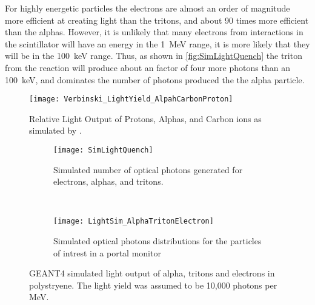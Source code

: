 For highly energetic particles the electrons are almost an order of magnitude more efficient at creating light than the tritons, and about 90 times more efficient than the alphas.
However, it is unlikely that many electrons from  interactions in the scintillator will have an energy in the \SI{1}{\MeV} range, it is more likely that they will be in the \SI{100}{\keV} range.
Thus, as shown in \autoref{fig:SimLightQuench} the triton from the  reaction will produce about an factor of four more photons than an \SI{100}{\keV}, and dominates the number of photons produced the the alpha particle.
\begin{figure}
  \centering
  \texttt{[image: Verbinski\_LightYield\_AlpahCarbonProton]}
  \caption[Relative Light Yield of Protons, Alphas, and Carbon ions in Anthracene]{Relative Light Output of Protons, Alphas, and Carbon ions as simulated by \cite{Verbinski_1968}.}
  \label{fig:VerbinskiLightOutput}
\end{figure}
\begin{figure}
  \centering
    \begin{subfigure}[b]{0.45\textwidth}
    \texttt{[image: SimLightQuench]}
    \caption{Simulated number of optical photons generated for electrons, alphas, and tritons.}
  \end{subfigure}%
  ~
  \begin{subfigure}[b]{0.45\textwidth}
    \texttt{[image: LightSim\_AlphaTritonElectron]}
    \caption{Simulated optical photons distributions for the particles of intrest in a portal monitor}
  \end{subfigure}
  \caption[Simulated Light Output of Alphas, Tritons, and Electrons]{GEANT4 simulated light output of alpha, tritons and electrons in polystryene. The light yield was assumed to be 10,000 photons per MeV.}
  \label{fig:SimLightOutputQuench}
\end{figure}



